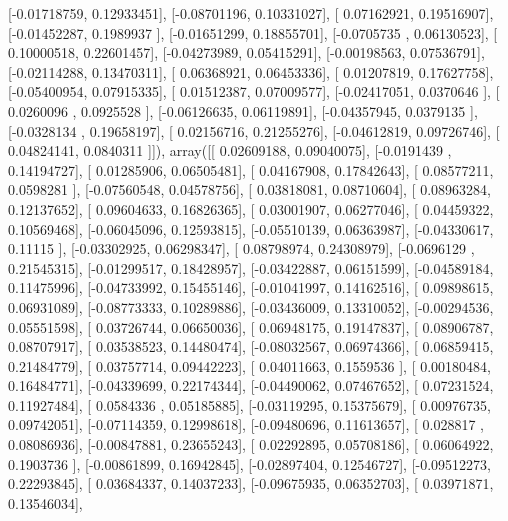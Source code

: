 \documentclass{article}
\begin{document}
       [-0.01718759,  0.12933451],
       [-0.08701196,  0.10331027],
       [ 0.07162921,  0.19516907],
       [-0.01452287,  0.1989937 ],
       [-0.01651299,  0.18855701],
       [-0.0705735 ,  0.06130523],
       [ 0.10000518,  0.22601457],
       [-0.04273989,  0.05415291],
       [-0.00198563,  0.07536791],
       [-0.02114288,  0.13470311],
       [ 0.06368921,  0.06453336],
       [ 0.01207819,  0.17627758],
       [-0.05400954,  0.07915335],
       [ 0.01512387,  0.07009577],
       [-0.02417051,  0.0370646 ],
       [ 0.0260096 ,  0.0925528 ],
       [-0.06126635,  0.06119891],
       [-0.04357945,  0.0379135 ],
       [-0.0328134 ,  0.19658197],
       [ 0.02156716,  0.21255276],
       [-0.04612819,  0.09726746],
       [ 0.04824141,  0.0840311 ]]), array([[ 0.02609188,  0.09040075],
       [-0.0191439 ,  0.14194727],
       [ 0.01285906,  0.06505481],
       [ 0.04167908,  0.17842643],
       [ 0.08577211,  0.0598281 ],
       [-0.07560548,  0.04578756],
       [ 0.03818081,  0.08710604],
       [ 0.08963284,  0.12137652],
       [ 0.09604633,  0.16826365],
       [ 0.03001907,  0.06277046],
       [ 0.04459322,  0.10569468],
       [-0.06045096,  0.12593815],
       [-0.05510139,  0.06363987],
       [-0.04330617,  0.11115   ],
       [-0.03302925,  0.06298347],
       [ 0.08798974,  0.24308979],
       [-0.0696129 ,  0.21545315],
       [-0.01299517,  0.18428957],
       [-0.03422887,  0.06151599],
       [-0.04589184,  0.11475996],
       [-0.04733992,  0.15455146],
       [-0.01041997,  0.14162516],
       [ 0.09898615,  0.06931089],
       [-0.08773333,  0.10289886],
       [-0.03436009,  0.13310052],
       [-0.00294536,  0.05551598],
       [ 0.03726744,  0.06650036],
       [ 0.06948175,  0.19147837],
       [ 0.08906787,  0.08707917],
       [ 0.03538523,  0.14480474],
       [-0.08032567,  0.06974366],
       [ 0.06859415,  0.21484779],
       [ 0.03757714,  0.09442223],
       [ 0.04011663,  0.1559536 ],
       [ 0.00180484,  0.16484771],
       [-0.04339699,  0.22174344],
       [-0.04490062,  0.07467652],
       [ 0.07231524,  0.11927484],
       [ 0.0584336 ,  0.05185885],
       [-0.03119295,  0.15375679],
       [ 0.00976735,  0.09742051],
       [-0.07114359,  0.12998618],
       [-0.09480696,  0.11613657],
       [ 0.028817  ,  0.08086936],
       [-0.00847881,  0.23655243],
       [ 0.02292895,  0.05708186],
       [ 0.06064922,  0.1903736 ],
       [-0.00861899,  0.16942845],
       [-0.02897404,  0.12546727],
       [-0.09512273,  0.22293845],
       [ 0.03684337,  0.14037233],
       [-0.09675935,  0.06352703],
       [ 0.03971871,  0.13546034],
\end{document}
